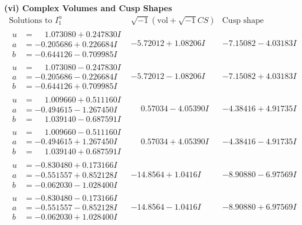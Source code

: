 \documentclass[1p]{elsarticle_modified}
\theoremstyle{definition}
\newcommand{\I}{\sqrt{-1}}
\begin{document}
\newpage\flushleft \textbf{(vi) Complex Volumes and Cusp Shapes}
$$\begin{array}{c|c|c}  
\text{Solutions to }I^u_{1}& \I (\text{vol} + \sqrt{-1}CS) & \text{Cusp shape}\\
 \hline 
\begin{aligned}
u &= \phantom{-}1.073080 + 0.247830 I \\
a &= -0.205686 + 0.226684 I \\
b &= -0.644126 - 0.709985 I\end{aligned}
 & -5.72012 + 1.08206 I & -7.15082 - 4.03183 I \\ \hline\begin{aligned}
u &= \phantom{-}1.073080 - 0.247830 I \\
a &= -0.205686 - 0.226684 I \\
b &= -0.644126 + 0.709985 I\end{aligned}
 & -5.72012 - 1.08206 I & -7.15082 + 4.03183 I \\ \hline\begin{aligned}
u &= \phantom{-}1.009660 + 0.511160 I \\
a &= -0.494615 - 1.267450 I \\
b &= \phantom{-}1.039140 - 0.687591 I\end{aligned}
 & \phantom{-}0.57034 - 4.05390 I & -4.38416 + 4.91735 I \\ \hline\begin{aligned}
u &= \phantom{-}1.009660 - 0.511160 I \\
a &= -0.494615 + 1.267450 I \\
b &= \phantom{-}1.039140 + 0.687591 I\end{aligned}
 & \phantom{-}0.57034 + 4.05390 I & -4.38416 - 4.91735 I \\ \hline\begin{aligned}
u &= -0.830480 + 0.173166 I \\
a &= -0.551557 + 0.852128 I \\
b &= -0.062030 - 1.028400 I\end{aligned}
 & -14.8564 + 1.0416 I & -8.90880 - 6.97569 I \\ \hline\begin{aligned}
u &= -0.830480 - 0.173166 I \\
a &= -0.551557 - 0.852128 I \\
b &= -0.062030 + 1.028400 I\end{aligned}
 & -14.8564 - 1.0416 I & -8.90880 + 6.97569 I \\ \hline\begin{aligned}

\end{aligned}
\end{array}$$
\end{document}
